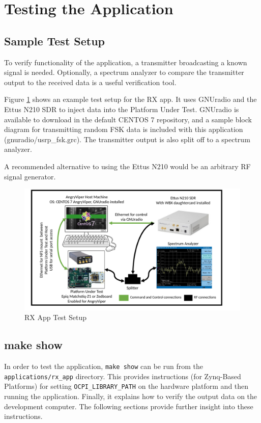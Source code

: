 \section{Testing the Application}
\subsection{Sample Test Setup}
\noindent To verify functionality of the application, a transmitter broadcasting a known signal is needed. Optionally, a spectrum analyzer to compare the transmitter output to the received data is a useful verification tool.\par\medskip
\noindent Figure \ref{fig:rx_app_test_setup} shows an example test setup for the RX app. It uses GNUradio and the Ettus N210 SDR to inject data into the Platform Under Test. GNUradio is available to download in the default CENTOS 7 repository, and a sample block diagram for transmitting random FSK data is included with this application (gnuradio/usrp\_fsk.grc). The transmitter output is also split off to a spectrum analyzer.\par\bigskip
\noindent A recommended alternative to using the Ettus N210 would be an arbitrary RF signal generator.
	\begin{figure}[h]
	 	\centering
		\includegraphics[scale=.55]{rx_app_test_setup}
		\caption{RX App Test Setup}
		\label{fig:rx_app_test_setup}
	\end{figure}
\subsection{make show}
\noindent In order to test the application, \texttt{make show} can be run from the \texttt{applications/rx\_app} directory. This provides instructions (for Zynq-Based Platforms) for setting \texttt{OCPI\_LIBRARY\_PATH} on the hardware platform and then running the application. Finally, it explains how to verify the output data on the development computer. The following sections provide further insight into these instructions.
